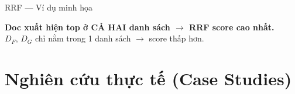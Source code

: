 \documentclass[aspectratio=169, 11pt]{beamer}
\begin{document}
\begin{frame}{RRF --- Ví dụ minh họa}
\vspace{0.3cm}

\begin{center}
\textcolor{accentTeal}{\textbf{Doc xuất hiện top ở CẢ HAI danh sách $\to$ RRF score cao nhất.}}\\[3pt]
{\small\textcolor{textLight}{$D_F$, $D_G$ chỉ nằm trong 1 danh sách $\to$ score thấp hơn.}}
\end{center}
\end{frame}

\section{Nghiên cứu thực tế (Case Studies)}
\end{document}
